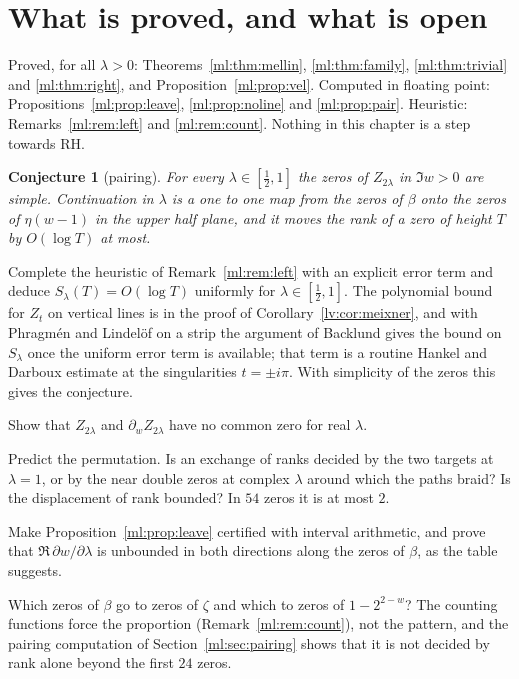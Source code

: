 \section{What is proved, and what is open}\label{ml:sec:open}
Proved, for all $\lambda>0$: Theorems~\ref{ml:thm:mellin}, \ref{ml:thm:family}, \ref{ml:thm:trivial} and \ref{ml:thm:right}, and Proposition~\ref{ml:prop:vel}. Computed in floating point: Propositions~\ref{ml:prop:leave}, \ref{ml:prop:noline} and \ref{ml:prop:pair}. Heuristic: Remarks~\ref{ml:rem:left} and \ref{ml:rem:count}. Nothing in this chapter is a step towards RH.\ifdefined\conjecture\else\theoremstyle{sc}\newtheorem{conjecture}[theorem]{Conjecture}\theoremstyle{scr}\fi
\begin{conjecture}[pairing]\label{ml:conj:pairing}
For every $\lambda\in[\frac12,1]$ the zeros of $Z_{2\lambda}$ in $\Im w>0$ are simple. Continuation in $\lambda$ is a one to one map from the zeros of $\beta$ onto the zeros of $\eta(w-1)$ in the upper half plane, and it moves the rank of a zero of height $T$ by $O(\log T)$ at most.
\end{conjecture}
\begin{problem}\label{ml:prob:count}
Complete the heuristic of Remark~\ref{ml:rem:left} with an explicit error term and deduce $S_\lambda(T)=O(\log T)$ uniformly for $\lambda\in[\frac12,1]$. The polynomial bound for $Z_t$ on vertical lines is in the proof of Corollary~\ref{lv:cor:meixner}, and with Phragm\'en and Lindel\"of on a strip the argument of Backlund gives the bound on $S_\lambda$ once the uniform error term is available; that term is a routine Hankel and Darboux estimate at the singularities $t=\pm i\pi$. With simplicity of the zeros this gives the conjecture.
\end{problem}
\begin{problem}\label{ml:prob:simple}
Show that $Z_{2\lambda}$ and $\partial_wZ_{2\lambda}$ have no common zero for real $\lambda$.
\end{problem}
\begin{problem}\label{ml:prob:perm}
Predict the permutation. Is an exchange of ranks decided by the two targets at $\lambda=1$, or by the near double zeros at complex $\lambda$ around which the paths braid? Is the displacement of rank bounded? In $54$ zeros it is at most $2$.
\end{problem}
\begin{problem}\label{ml:prob:vel}
Make Proposition~\ref{ml:prop:leave} certified with interval arithmetic, and prove that $\Re\,\partial w/\partial\lambda$ is unbounded in both directions along the zeros of $\beta$, as the table suggests.
\end{problem}
\begin{problem}\label{ml:prob:which}
Which zeros of $\beta$ go to zeros of $\zeta$ and which to zeros of $1-2^{2-w}$? The counting functions force the proportion (Remark~\ref{ml:rem:count}), not the pattern, and the pairing computation of Section~\ref{ml:sec:pairing} shows that it is not decided by rank alone beyond the first $24$ zeros.
\end{problem}
